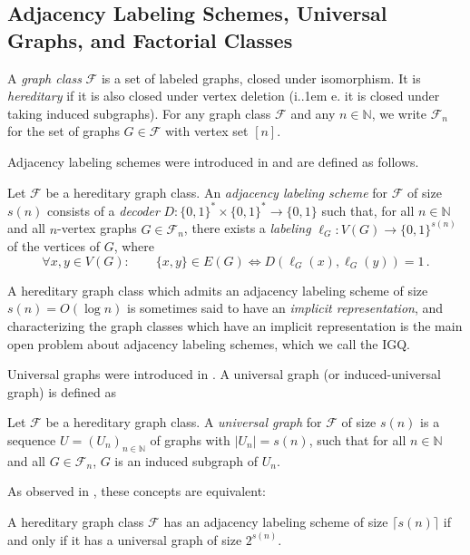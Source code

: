 \documentclass{article}
\makeatletter
\newcommand{\zo}{\{0,1\}}
\newcommand{\cF}{\ensuremath{\mathcal{F}}}
\newcommand{\bN}{\ensuremath{\mathbb{N}}}
\newcommand*\ie{i.\kern.1em e.\@\xspace} %
\makeatother
\begin{document}
\subsection{Adjacency Labeling Schemes, Universal Graphs, and Factorial Classes}

A \emph{graph class} $\cF$ is a set of labeled graphs, closed under isomorphism. It is
\emph{hereditary} if it is also closed under vertex deletion (\ie it is closed under taking induced
subgraphs). For any graph class $\cF$ and any $n \in \bN$, we write $\cF_n$ for the set of graphs $G
\in \cF$ with vertex set $[n]$.

Adjacency labeling schemes were introduced in \cite{Mul89, KNR92} and are defined as follows.

\begin{definition}
Let $\cF$ be a hereditary graph class. An \emph{adjacency labeling scheme} for $\cF$ of size $s(n)$
consists of a \emph{decoder} $D : \zo^* \times \zo^* \to \zo$ such that, for all $n \in \bN$ and all
$n$-vertex graphs $G \in \cF_n$, there exists a \emph{labeling} $\ell_G : V(G) \to \zo^{s(n)}$ of the
vertices of $G$, where
\[
  \forall x,y \in V(G) : \qquad \{x,y\} \in E(G) \iff D(\ell_G(x), \ell_G(y)) = 1 \,.
\]
\end{definition}
A hereditary graph class which admits an adjacency labeling scheme of size $s(n) = O(\log n)$ is
sometimes said to have an \emph{implicit representation}, and characterizing the graph classes which
have an implicit representation is the main open problem about adjacency labeling schemes, which we
call the IGQ.

Universal graphs were introduced in \cite{Rado64}. A universal graph (or induced-universal graph) is
defined as

\begin{definition}
Let $\cF$ be a hereditary graph class. A \emph{universal graph} for $\cF$ of size $s(n)$ is a
sequence $U = (U_n)_{n \in \bN}$ of graphs with $|U_n| = s(n)$, such that for all $n \in \bN$ and all $G \in
\cF_n$, $G$ is an induced subgraph of $U_n$.
\end{definition}

As observed in \cite{KNR92}, these concepts are equivalent:
\begin{proposition}
A hereditary graph class $\cF$ has an adjacency labeling scheme of size $\lceil s(n) \rceil$ if and
only if it has a universal graph of size $2^{s(n)}$.
\end{proposition}
\end{document}
